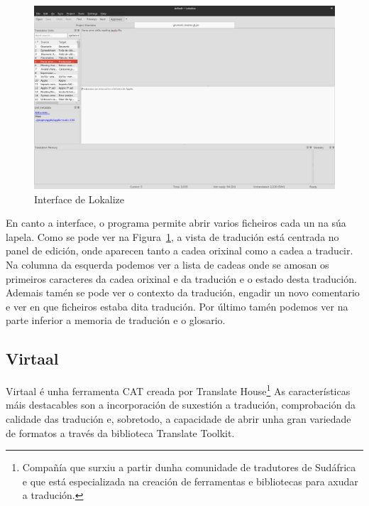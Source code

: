 \begin{figure}[h]
    \centering
    \includegraphics[width=\textwidth]{img/captura_lokalize.png}
    \caption{Interface de Lokalize}
    \label{fig:lokalize}
\end{figure}

En canto a interface, o programa permite abrir varios ficheiros cada un na súa lapela. Como se pode ver na Figura~\ref{fig:lokalize}, a vista de tradución está centrada no panel de edición, onde aparecen tanto a cadea orixinal como a cadea a traducir. Na columna da esquerda podemos ver a lista de cadeas onde se amosan os primeiros caracteres da cadea orixinal e da tradución e o estado desta tradución. Ademais tamén se pode ver o contexto da tradución, engadir un novo comentario e ver en que ficheiros estaba dita tradución. Por último tamén podemos ver na parte inferior a memoria de tradución e o glosario.

\subsection{Virtaal}

Virtaal é unha ferramenta CAT creada por Translate House\footnote{Compañía que surxiu a partir dunha comunidade de tradutores de Sudáfrica e que está especializada na creación de ferramentas e bibliotecas para axudar a tradución.} As características máis destacables son a incorporación de suxestión a tradución, comprobación da calidade das tradución e, sobretodo, a capacidade de abrir unha gran variedade de formatos a través da biblioteca Translate Toolkit.


